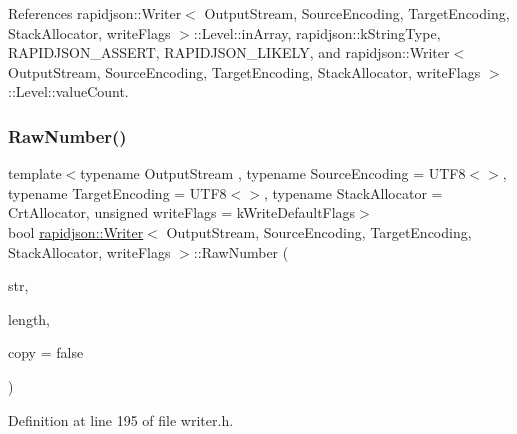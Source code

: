 References rapidjson\+::\+Writer$<$ Output\+Stream, Source\+Encoding, Target\+Encoding, Stack\+Allocator, write\+Flags $>$\+::\+Level\+::in\+Array, rapidjson\+::k\+String\+Type, R\+A\+P\+I\+D\+J\+S\+O\+N\+\_\+\+A\+S\+S\+E\+RT, R\+A\+P\+I\+D\+J\+S\+O\+N\+\_\+\+L\+I\+K\+E\+LY, and rapidjson\+::\+Writer$<$ Output\+Stream, Source\+Encoding, Target\+Encoding, Stack\+Allocator, write\+Flags $>$\+::\+Level\+::value\+Count.

\mbox{\label{classrapidjson_1_1_writer_a65a378b4de5df3fb02521a4a78b25230}} 
\subsubsection{\texorpdfstring{RawNumber()}{RawNumber()}}
{\footnotesize\ttfamily template$<$typename Output\+Stream , typename Source\+Encoding  = U\+T\+F8$<$$>$, typename Target\+Encoding  = U\+T\+F8$<$$>$, typename Stack\+Allocator  = Crt\+Allocator, unsigned write\+Flags = k\+Write\+Default\+Flags$>$ \\
bool \mbox{\hyperlink{classrapidjson_1_1_writer}{rapidjson\+::\+Writer}}$<$ Output\+Stream, Source\+Encoding, Target\+Encoding, Stack\+Allocator, write\+Flags $>$\+::Raw\+Number (\begin{DoxyParamCaption}\item[{const \mbox{\hyperlink{classrapidjson_1_1_writer_a2cf973937ca1110293bf1350fac2a6d6}{Ch}} $\ast$}]{str,  }\item[{\mbox{\hyperlink{namespacerapidjson_a44eb33eaa523e36d466b1ced64b85c84}{Size\+Type}}}]{length,  }\item[{bool}]{copy = {\ttfamily false} }\end{DoxyParamCaption})}



Definition at line 195 of file writer.\+h.


